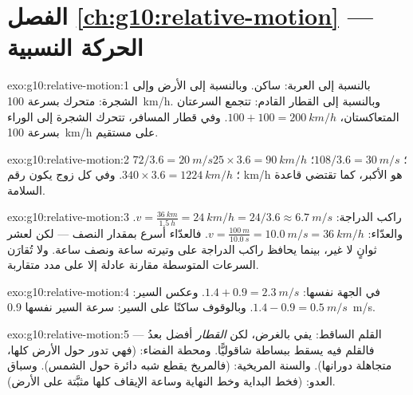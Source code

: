 \section*{الفصل \ref{ch:g10:relative-motion} --- الحركة النسبية}

\begin{solution}{exo:g10:relative-motion:1}
بالنسبة إلى العربة: ساكن. وبالنسبة إلى الأرض وإلى
الشجرة: متحرك بسرعة \qty{100}{km/h}. وبالنسبة إلى القطار القادم:
تتجمع السرعتان المتعاكستان، $100 + 100 = \qty{200}{km/h}$. وفي
 قطار المسافر، تتحرك الشجرة إلى الوراء بسرعة
\qty{100}{km/h} على مستقيم.
\end{solution}

\begin{solution}{exo:g10:relative-motion:2}
$72 / 3.6 = \qty{20}{m/s}$؛ $108 / 3.6 = \qty{30}{m/s}$؛
$25 \times 3.6 = \qty{90}{km/h}$؛ $340 \times 3.6 = \qty{1224}{km/h}$.
وفي كل زوج يكون رقم \unit{km/h} هو الأكبر، كما تقتضي قاعدة
السلامة.
\end{solution}

\begin{solution}{exo:g10:relative-motion:3}
راكب الدراجة: $v = \frac{\qty{36}{km}}{\qty{1.5}{h}} = \qty{24}{km/h}
= 24/3.6 \approx \qty{6.7}{m/s}$. والعدّاء:
$v = \frac{\qty{100}{m}}{\qty{10.0}{s}} = \qty{10.0}{m/s}
= \qty{36}{km/h}$. فالعدّاء أسرع بمقدار النصف --- لكن لعشر
ثوانٍ لا غير، بينما يحافظ راكب الدراجة على وتيرته ساعة ونصف ساعة.
ولا تُقارَن السرعات المتوسطة مقارنة عادلة إلا على مدد متقاربة.
\end{solution}

\begin{solution}{exo:g10:relative-motion:4}
في الجهة نفسها: $1.4 + 0.9 = \qty{2.3}{m/s}$. وعكس السير:
$1.4 - 0.9 = \qty{0.5}{m/s}$. وبالوقوف ساكنًا على السير: سرعة السير نفسها
\qty{0.9}{m/s}.
\end{solution}

\begin{solution}{exo:g10:relative-motion:5}
القلم الساقط:  يفي بالغرض، لكن  \emph{القطار} أفضل
بعدُ --- فالقلم فيه يسقط ببساطة شاقوليًّا. ومحطة الفضاء:
 (فهي تدور حول الأرض كلها، متجاهلة دورانها).
والسنة المريخية:  (فالمريخ يقطع شبه دائرة حول
الشمس). وسباق العدو:  (فخط البداية وخط النهاية وساعة الإيقاف
كلها مثبَّتة على الأرض).
\end{solution}

